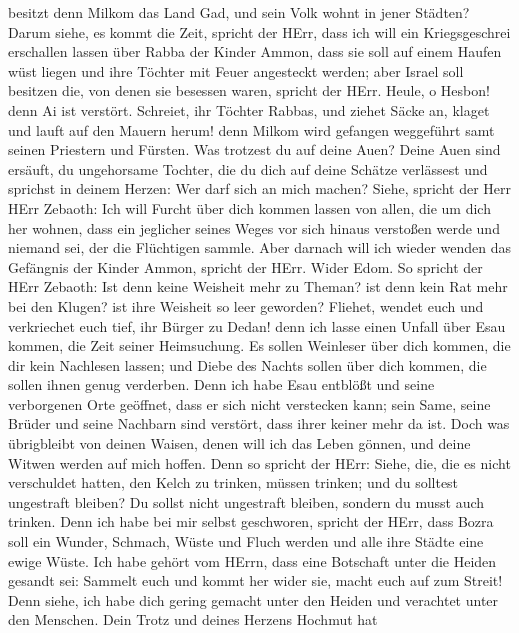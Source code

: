 besitzt denn Milkom das Land Gad, und sein Volk wohnt in jener Städten?
 Darum siehe, es kommt die Zeit, spricht der HErr, dass ich
will ein Kriegsgeschrei erschallen lassen über Rabba der Kinder Ammon,
dass sie soll auf einem Haufen wüst liegen und ihre Töchter mit Feuer
angesteckt werden; aber Israel soll besitzen die, von denen sie besessen
waren, spricht der HErr.  Heule, o Hesbon! denn Ai ist
verstört. Schreiet, ihr Töchter Rabbas, und ziehet Säcke an, klaget und
lauft auf den Mauern herum! denn Milkom wird gefangen weggeführt samt
seinen Priestern und Fürsten.  Was trotzest du auf deine
Auen? Deine Auen sind ersäuft, du ungehorsame Tochter, die du dich auf
deine Schätze verlässest und sprichst in deinem Herzen: Wer darf sich an
mich machen?  Siehe, spricht der Herr HErr Zebaoth: Ich will
Furcht über dich kommen lassen von allen, die um dich her wohnen, dass
ein jeglicher seines Weges vor sich hinaus verstoßen werde und niemand
sei, der die Flüchtigen sammle.  Aber darnach will ich
wieder wenden das Gefängnis der Kinder Ammon, spricht der HErr.
 Wider Edom. So spricht der HErr Zebaoth: Ist denn keine
Weisheit mehr zu Theman? ist denn kein Rat mehr bei den Klugen? ist ihre
Weisheit so leer geworden?  Fliehet, wendet euch und
verkriechet euch tief, ihr Bürger zu Dedan! denn ich lasse einen Unfall
über Esau kommen, die Zeit seiner Heimsuchung.  Es sollen
Weinleser über dich kommen, die dir kein Nachlesen lassen; und Diebe des
Nachts sollen über dich kommen, die sollen ihnen genug verderben.
 Denn ich habe Esau entblößt und seine verborgenen Orte
geöffnet, dass er sich nicht verstecken kann; sein Same, seine Brüder
und seine Nachbarn sind verstört, dass ihrer keiner mehr da ist.
 Doch was übrigbleibt von deinen Waisen, denen will ich das
Leben gönnen, und deine Witwen werden auf mich hoffen. 
Denn so spricht der HErr: Siehe, die, die es nicht verschuldet hatten,
den Kelch zu trinken, müssen trinken; und du solltest ungestraft
bleiben? Du sollst nicht ungestraft bleiben, sondern du musst auch
trinken.  Denn ich habe bei mir selbst geschworen, spricht
der HErr, dass Bozra soll ein Wunder, Schmach, Wüste und Fluch werden
und alle ihre Städte eine ewige Wüste.  Ich habe gehört vom
HErrn, dass eine Botschaft unter die Heiden gesandt sei: Sammelt euch
und kommt her wider sie, macht euch auf zum Streit!  Denn
siehe, ich habe dich gering gemacht unter den Heiden und verachtet unter
den Menschen.  Dein Trotz und deines Herzens Hochmut hat
